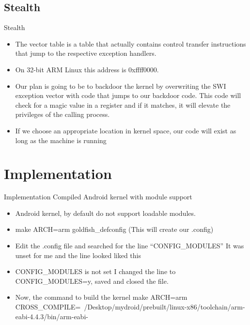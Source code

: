 \documentclass{beamer}
\begin{document}
\subsection{Stealth}
\begin{frame}{Stealth\cite{doar-e}}
\begin{itemize}
\item The vector table is a table that actually contains control transfer instructions that jump to the respective exception handlers.\\

\item On 32-bit ARM Linux this address is 0xffff0000.\\
\item Our plan is going to be to backdoor the kernel by overwriting the SWI exception vector with code that jumps to our backdoor code. This code will check for a magic value in a register and if it matches, it will elevate the privileges of the calling process.\\
\item If we choose an appropriate location in kernel space, our code will exist as long as the machine is running

\end{itemize}
\end{frame}







\section{Implementation}
\begin{frame}{Implementation}
Compiled Android kernel with module support
\begin{itemize}
\item Android kernel, by default do not support loadable modules. 
\item make ARCH=arm goldfish\_defconfig (This will create our .config)
\item Edit the .config file and searched for the line “CONFIG\_MODULES”
It was unset for me and the line looked liked this
\item CONFIG\_MODULES is not set
I changed the line to CONFIG\_MODULES=y, saved and closed the file.
\item Now, the command to build the kernel
make ARCH=arm CROSS\_COMPILE=~/Desktop/mydroid/prebuilt/linux-x86/toolchain/arm-eabi-4.4.3/bin/arm-eabi-


\end{itemize}
\end{frame}
\end{document}
